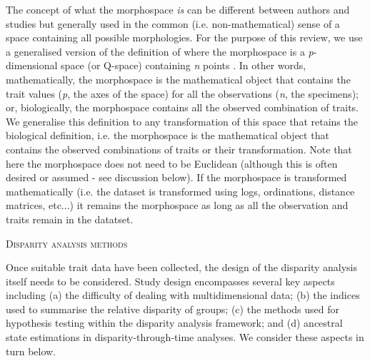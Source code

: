 \documentclass[12pt,letterpaper]{article}
\renewcommand{\section}[1]{%
\bigskip
\begin{center}
\begin{Large}
\normalfont\scshape #1
\medskip
\end{Large}
\end{center}}
\begin{document}
The concept of what the morphospace \textit{is} can be different between authors and studies but generally used in the common (i.e. non-mathematical) sense of a space containing all possible morphologies.
For the purpose of this review, we use a generalised version of the definition of \cite{mitteroecker2009concept} where the morphospace is a \textit{p}-dimensional space (or Q-space) containing \textit{n} points \citep{mitteroecker2009concept}.
In other words, mathematically, the morphospace is the mathematical object that contains the trait values (\textit{p}, the axes of the space) for all the observations (\textit{n}, the specimens); or, biologically, the morphospace contains all the observed combination of traits.
We generalise this definition to any transformation of this space that retains the biological definition, i.e. the morphospace is the mathematical object that contains the observed combinations of traits or their transformation.
Note that here the morphospace does not need to be Euclidean (although this is often desired or assumed - see discussion below). %
If the morphospace is transformed mathematically (i.e. the dataset is transformed using logs, ordinations, distance matrices, etc...) it remains the morphospace as long as all the observation and traits remain in the datatset.



\section{Disparity analysis methods}

\noindent Once suitable trait data have been collected, the design of the disparity analysis itself needs to be considered.
Study design encompasses several key aspects including (a) the difficulty of dealing with multidimensional data; (b) the indices used to summarise the relative disparity of groups; (c) the methods used for hypothesis testing within the disparity analysis framework; and (d) ancestral state estimations in disparity-through-time analyses.
We consider these aspects in turn below.
\end{document}
